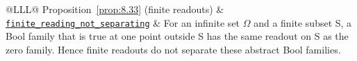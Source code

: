 \begin{xltabular}{\linewidth}{@{}LLL@{}}
\addlinespace[3pt]
Proposition~\ref{prop:8.33} (finite readouts) & \href{https://github.com/iroha1203/AlgebraicArchitectureTheoryV2/blob/719f81f47d410701fd82c2bc88613cc140c59377/research/lean/ResearchLean/AG/LocalSemanticReconstruction/TagChangeFiniteReconstruction.lean\#L188}{\texttt{finite\_\allowbreak{}reading\_\allowbreak{}not\_\allowbreak{}separating}} & For an infinite set $\Omega$ and a finite subset S, a Bool family that is true at one point outside S has the same readout on S as the zero family. Hence finite readouts do not separate these abstract Bool families. \\
\bottomrule
\end{xltabular}
